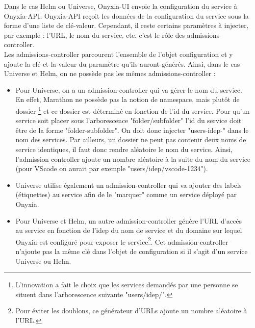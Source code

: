 \documentclass[11pt,fleqn]{book} %
\begin{document}
\vspace{-0.5cm}
Dans le cas Helm ou Universe, Onyxia-UI envoie la configuration du service à Onyxia-API. Onyxia-API reçoit les données de la configuration du service sous la forme d'une liste de clé-valeur. Cependant, il reste certains paramètres à injecter, par exemple : l'URL, le nom du service, etc. c'est le rôle des admissions-controller.\\

Les admissions-controller parcourent l'ensemble de l'objet configuration et y ajoute la clé et la valeur du paramètre qu'ils auront générés. Ainsi, dans le cas Universe et Helm, on ne possède pas les mêmes admissions-controller : \\
\begin{itemize}
    \item Pour Universe, on a un admission-controller qui va gérer le nom du service. En effet, Marathon ne possède pas la notion de namespace, mais plutôt de dossier \footnote{L'innovation a fait le choix que les services demandés par une personne se situent dans l'arborescence suivante "users/idep/".} et ce dossier est déterminé en fonction de l'id du service. Pour qu'un service soit placer sous l'arborescence "folder/subfolder" l'id du service doit être de la forme "folder-subfolder". On doit donc injecter "users-idep-" dans le nom des services. Par ailleurs, un dossier ne peut pas contenir deux noms de service identiques, il faut donc rendre aléatoire le nom du service. Ainsi, l'admission controller ajoute un nombre aléatoire à la suite du nom du service (pour VScode on aurait par exemple "users/idep/vscode-1234").\\
    
    \item Universe utilise également un admission-controller qui va ajouter des labels (étiquettes) au service afin de le "marquer" comme un service déployé par Onyxia. \\
    
    \item Pour Universe et Helm, un autre admission-controller génère l'URL d'accès au service en fonction de l'idep du nom de service et du domaine sur lequel Onyxia est configuré pour exposer le service\footnote{Pour éviter les doublons, ce générateur d'URLs ajoute un nombre aléatoire à l'URL.}. Cet admission-controller n'ajoute pas la même clé dans l'objet de configuration si il s'agit d'un service Universe ou Helm.\\
\end{itemize}
\end{document}
